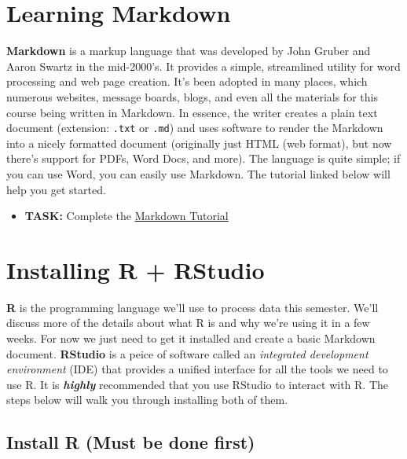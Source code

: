 \documentclass[]{tufte-book}
\providecommand{\tightlist}{%
  \setlength{\itemsep}{0pt}\setlength{\parskip}{0pt}}
\begin{document}
\hypertarget{learning-markdown}{%
\section*{Learning Markdown}\label{learning-markdown}}

\textbf{Markdown} is a markup language that was developed by John Gruber and Aaron Swartz in the mid-2000's. It provides a simple, streamlined utility for word processing and web page creation. It's been adopted in many places, which numerous websites, message boards, blogs, and even all the materials for this course being written in Markdown. In essence, the writer creates a plain text document (extension: \texttt{.txt} or \texttt{.md}) and uses software to render the Markdown into a nicely formatted document (originally just HTML (web format), but now there's support for PDFs, Word Docs, and more). The language is quite simple; if you can use Word, you can easily use Markdown. The tutorial linked below will help you get started.

\begin{itemize}
\tightlist
\item
  \textbf{TASK:} Complete the \href{https://www.markdowntutorial.com/}{Markdown Tutorial}
\end{itemize}

\hypertarget{install-r}{%
\section*{Installing R + RStudio}\label{install-r}}

\textbf{R} is the programming language we'll use to process data this semester. We'll discuss more of the details about what R is and why we're using it in a few weeks. For now we just need to get it installed and create a basic Markdown document. \textbf{RStudio} is a peice of software called an \emph{integrated development environment} (IDE) that provides a unified interface for all the tools we need to use R. It is \textbf{\emph{highly}} recommended that you use RStudio to interact with R. The steps below will walk you through installing both of them.

\hypertarget{install-r-must-be-done-first}{%
\subsection*{Install R (Must be done first)}\label{install-r-must-be-done-first}}
\end{document}
